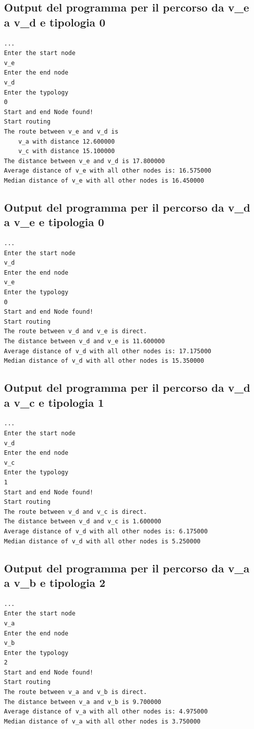 \documentclass[11pt, a4paper, titlepage, block]{article}
\begin{document}
	\subsection{Output del programma per il percorso da v\_e a v\_d e tipologia 0}
	\begin{lstlisting}
...
Enter the start node
v_e
Enter the end node
v_d
Enter the typology
0
Start and end Node found!
Start routing
The route between v_e and v_d is
	v_a with distance 12.600000
	v_c with distance 15.100000
The distance between v_e and v_d is 17.800000
Average distance of v_e with all other nodes is: 16.575000
Median distance of v_e with all other nodes is 16.450000
	\end{lstlisting}
	\newpage
	\subsection{Output del programma per il percorso da v\_d a v\_e e tipologia 0}
	\begin{lstlisting}
...
Enter the start node
v_d
Enter the end node
v_e
Enter the typology
0
Start and end Node found!
Start routing
The route between v_d and v_e is direct.
The distance between v_d and v_e is 11.600000
Average distance of v_d with all other nodes is: 17.175000
Median distance of v_d with all other nodes is 15.350000
	\end{lstlisting}
	
		\subsection{Output del programma per il percorso da v\_d a v\_c e tipologia 1}
	\begin{lstlisting}
...
Enter the start node
v_d
Enter the end node
v_c
Enter the typology
1
Start and end Node found!
Start routing
The route between v_d and v_c is direct.
The distance between v_d and v_c is 1.600000
Average distance of v_d with all other nodes is: 6.175000
Median distance of v_d with all other nodes is 5.250000
	\end{lstlisting}
	\newpage
	\subsection{Output del programma per il percorso da v\_a a v\_b e tipologia 2}
	\begin{lstlisting}
...
Enter the start node
v_a
Enter the end node
v_b
Enter the typology
2
Start and end Node found!
Start routing
The route between v_a and v_b is direct.
The distance between v_a and v_b is 9.700000
Average distance of v_a with all other nodes is: 4.975000
Median distance of v_a with all other nodes is 3.750000
	\end{lstlisting}
\end{document}
